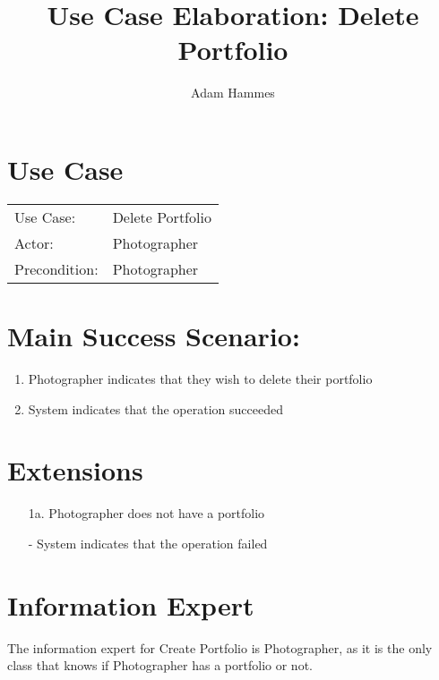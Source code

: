 \documentclass{article}
\title{Use Case Elaboration: Delete Portfolio}
\author{ Adam Hammes }
\begin{document}
\maketitle


\section*{Use Case}
\begin{tabular}{l l}
Use Case:     & Delete Portfolio\\
Actor:        & Photographer \\
Precondition: & Photographer \\
\end{tabular}


\section*{Main Success Scenario:}

\begin{enumerate}
    \item Photographer indicates that they wish to delete their portfolio
    \item System indicates that the operation succeeded

\end{enumerate}

\section*{Extensions}

\begin{itemize}
    \item [1a.] Photographer does not have a portfolio
    
    - System indicates that the operation failed
                            
\end{itemize}


\section*{Information Expert}

The information expert for Create Portfolio is Photographer, as it is the only class that knows if Photographer has a portfolio or not.
\end{document}
